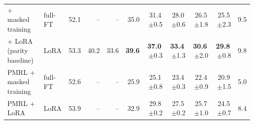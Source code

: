\begin{table}[t]
\begin{tabular}{llrrr@{\hskip 14pt}rrrrrr}
\quad + masked training & full-FT & 52.1 & -- & -- & 35.0 & 31.4\,\tiny{$\pm$0.5} & 28.0\,\tiny{$\pm$0.6} & 26.5\,\tiny{$\pm$1.8} & 25.5\,\tiny{$\pm$2.3} & 9.5 \\
\quad + LoRA (parity baseline) & LoRA & 53.3 & 40.2 & 33.6 & \textbf{39.6} & \textbf{37.0}\,\tiny{$\pm$0.3} & \textbf{33.4}\,\tiny{$\pm$1.3} & \textbf{30.6}\,\tiny{$\pm$2.0} & \textbf{29.8}\,\tiny{$\pm$0.8} & 9.8 \\
\midrule
PMRL + masked training & full-FT & 52.6 & -- & -- & 25.9 & 25.1\,\tiny{$\pm$0.8} & 23.4\,\tiny{$\pm$0.3} & 22.4\,\tiny{$\pm$0.9} & 20.9\,\tiny{$\pm$1.5} & 5.0 \\
PMRL + LoRA & LoRA & 53.9 & -- & -- & 32.9 & 29.8\,\tiny{$\pm$0.2} & 27.5\,\tiny{$\pm$0.2} & 25.7\,\tiny{$\pm$1.0} & 24.5\,\tiny{$\pm$0.7} & 8.4 \\
\bottomrule
\end{tabular}
\end{table}
